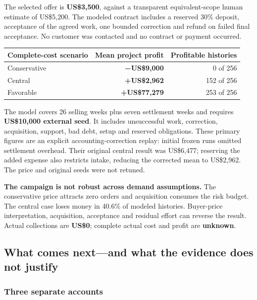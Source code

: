 \documentclass[
  10pt,
  letterpaper,
]{article}
\begin{document}
The selected offer is \textbf{US\$3,500}, against a transparent
equivalent-scope human estimate of US\$5,200. The modeled contract
includes a reserved 30\% deposit, acceptance of the agreed work, one
bounded correction and refund on failed final acceptance. No customer
was contacted and no contract or payment occurred.

\begin{longtable}[]{@{}lrr@{}}
\toprule\noalign{}
Complete-cost scenario & Mean project profit & Profitable histories \\
\midrule\noalign{}
\endhead
\bottomrule\noalign{}
\endlastfoot
Conservative & \textbf{−US\$9,000} & 0 of 256 \\
Central & \textbf{+US\$2,962} & 152 of 256 \\
Favorable & \textbf{+US\$77,279} & 253 of 256 \\
\end{longtable}

The model covers 26 selling weeks plus seven settlement weeks and
requires \textbf{US\$10,000 external seed}. It includes unsuccessful
work, correction, acquisition, support, bad debt, setup and reserved
obligations. These primary figures are an explicit accounting-correction
replay: initial frozen runs omitted settlement overhead. Their original
central result was US\$6,477; reserving the added expense also restricts
intake, reducing the corrected mean to US\$2,962. The price and original
seeds were not retuned.

\textbf{The campaign is not robust across demand assumptions.} The
conservative price attracts zero orders and acquisition consumes the
risk budget. The central case loses money in 40.6\% of modeled
histories. Buyer-price interpretation, acquisition, acceptance and
residual effort can reverse the result. Actual collections are
\textbf{US\$0}; complete actual cost and profit are \textbf{unknown}.

\newpage

\hypertarget{what-comes-nextand-what-the-evidence-does-not-justify}{%
\subsection{What comes next---and what the evidence does not
justify}\label{what-comes-nextand-what-the-evidence-does-not-justify}}

\hypertarget{three-separate-accounts}{%
\subsubsection{Three separate accounts}\label{three-separate-accounts}}
\end{document}
